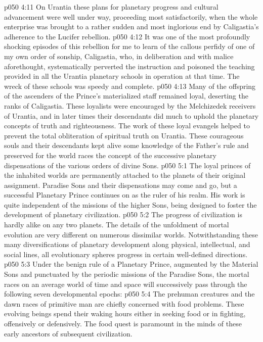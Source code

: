 \pc \vs p050 4:11 On Urantia these plans for planetary progress and cultural advancement were well under way, proceeding most satisfactorily, when the whole enterprise was brought to a rather sudden and most inglorious end by Caligastia’s adherence to the Lucifer rebellion.
\vs p050 4:12 It was one of the most profoundly shocking episodes of this rebellion for me to learn of the callous perfidy of one of my own order of sonship, Caligastia, who, in deliberation and with malice aforethought, systematically perverted the instruction and poisoned the teaching provided in all the Urantia planetary schools in operation at that time. The wreck of these schools was speedy and complete.
\vs p050 4:13 Many of the offspring of the ascenders of the Prince’s materialized staff remained loyal, deserting the ranks of Caligastia. These loyalists were encouraged by the Melchizedek receivers of Urantia, and in later times their descendants did much to uphold the planetary concepts of truth and righteousness. The work of these loyal evangels helped to prevent the total obliteration of spiritual truth on Urantia. These courageous souls and their descendants kept alive some knowledge of the Father’s rule and preserved for the world races the concept of the successive planetary dispensations of the various orders of divine Sons.
\vs p050 5:1 The loyal princes of the inhabited worlds are permanently attached to the planets of their original assignment. Paradise Sons and their dispensations may come and go, but a successful Planetary Prince continues on as the ruler of his realm. His work is quite independent of the missions of the higher Sons, being designed to foster the development of planetary civilization.
\vs p050 5:2 The progress of civilization is hardly alike on any two planets. The details of the unfoldment of mortal evolution are very different on numerous dissimilar worlds. Notwithstanding these many diversifications of planetary development along physical, intellectual, and social lines, all evolutionary spheres progress in certain well\hyp{}defined directions.
\vs p050 5:3 Under the benign rule of a Planetary Prince, augmented by the Material Sons and punctuated by the periodic missions of the Paradise Sons, the mortal races on an average world of time and space will successively pass through the following seven developmental epochs:
\pc \vs p050 5:4 \bibnobreakspace {} The prehuman creatures and the dawn races of primitive man are chiefly concerned with food problems. These evolving beings spend their waking hours either in seeking food or in fighting, offensively or defensively. The food quest is paramount in the minds of these early ancestors of subsequent civilization.
